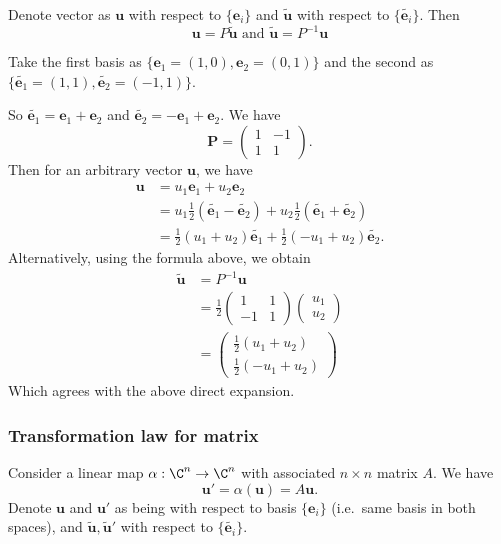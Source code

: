 \documentclass[a4paper]{article}
\begin{document}
\begin{thm}
  Denote vector as $\mathbf{u}$ with respect to $\{\mathbf{e}_i\}$ and $\tilde{\mathbf{u}}$ with respect to $\{\tilde{\mathbf{e}_i}\}$. Then
  \[
    \mathbf{u} = P\mathbf{\tilde{u}}\text{ and }\mathbf{\tilde{u}} = P^{-1}\mathbf{u}
  \]
\end{thm}

\begin{eg}
  Take the first basis as $\{\mathbf{e}_1 = (1, 0), \mathbf{e}_2 = (0, 1)\}$ and the second as $\{\tilde{\mathbf{e}_1} = (1, 1), \tilde{\mathbf{e}_2} = (-1, 1)\}$.

  So $\tilde{\mathbf{e}_1} = \mathbf{e}_1 + \mathbf{e}_2$ and $\tilde{\mathbf{e}_2} = -\mathbf{e}_1 + \mathbf{e}_2$. We have
  \[
    \mathbf{P} =
    \begin{pmatrix}
      1 & -1\\
      1 & 1
    \end{pmatrix}.
  \]
  Then for an arbitrary vector $\mathbf{u}$, we have
  \begin{align*}
    \mathbf{u}&= u_1\mathbf{e}_1 + u_2\mathbf{e}_2\\
    &= u_1\frac{1}{2}(\tilde{\mathbf{e}_1} - \tilde{\mathbf{e}_2}) + u_2\frac{1}{2}(\tilde{\mathbf{e}_1} + \tilde{\mathbf{e}_2})\\
    &= \frac{1}{2}(u_1 + u_2)\tilde{\mathbf{e}_1} + \frac{1}{2}(-u_1 + u_2)\tilde{\mathbf{e}_2}.
  \end{align*}
  Alternatively, using the formula above, we obtain
  \begin{align*}
    \mathbf{\tilde{u}} &= P^{-1} \mathbf{u}\\
    &= \frac{1}{2}
    \begin{pmatrix}
      1&1\\-1&1
    \end{pmatrix}
    \begin{pmatrix}
      u_1\\u_2
    \end{pmatrix}\\
    &=
    \begin{pmatrix}
      \frac{1}{2}(u_1 + u_2)\\
      \frac{1}{2}(-u_1 + u_2)
    \end{pmatrix}
  \end{align*}
  Which agrees with the above direct expansion.
\end{eg}
\subsubsection{Transformation law for matrix}
Consider a linear map $\alpha: \C^n \to \C^n$ with associated $n\times n$ matrix $A$. We have
\[
  \mathbf{u}' = \alpha(\mathbf{u}) = A\mathbf{u}.
\]
Denote $\mathbf{u}$ and $\mathbf{u}'$ as being with respect to basis $\{\mathbf{e}_i\}$ (i.e.\ same basis in both spaces), and $\mathbf{\tilde{u}, \tilde{u}'}$ with respect to $\{\tilde{\mathbf{e}_i}\}$.
\end{document}
